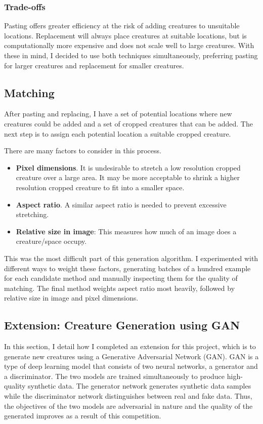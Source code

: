 \documentclass[12pt,a4paper,twoside,openany]{report}
\begin{document}
\subsubsection{Trade-offs}
Pasting offers greater efficiency at the risk of adding creatures to unsuitable locations. Replacement will always place creatures at suitable locations, but is computationally more expensive and does not scale well to large creatures. With these in mind, I decided to use both techniques simultaneously, preferring pasting for larger creatures and replacement for smaller creatures.

\subsection{Matching}
After pasting and replacing, I have a set of potential locations where new creatures could be added and a set of cropped creatures that can be added. The next step is to assign each potential location a suitable cropped creature. 

There are many factors to consider in this process.
\begin{itemize}
    \item \textbf{Pixel dimensions}. It is undesirable to stretch a low resolution cropped creature over a large area. It may be more acceptable to shrink a higher resolution cropped creature to fit into a smaller space.
    \item \textbf{Aspect ratio}. A similar aspect ratio is needed to prevent excessive stretching.
    \item \textbf{Relative size in image}: This measures how much of an image does a creature/space occupy. 
\end{itemize}

This was the most difficult part of this generation algorithm. I experimented with different ways to weight these factors, generating batches of a hundred example for each candidate method and manually inspecting them for the quality of matching. The final method weights aspect ratio most heavily, followed by relative size in image and pixel dimensions. 

\subsection{Extension: Creature Generation using GAN}
In this section, I detail how I completed an extension for this project, which is to generate new creatures using a Generative Adversarial Network (GAN). GAN is a type of deep learning model that consists of two neural networks, a generator and a discriminator. The two models are trained simultaneously to produce high-quality synthetic data. The generator network generates synthetic data samples while the discriminator network distinguishes between real and fake data. Thus, the objectives of the two models are adversarial in nature and the quality of the generated improves as a result of this competition.
\end{document}
